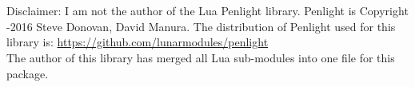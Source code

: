 \documentclass{article}
\begin{document}
    \section*{}
    Disclaimer: I am not the author of the Lua Penlight library.
    Penlight is Copyright -2016 Steve Donovan, David Manura.
    The distribution of Penlight used for this library is:
\url{https://github.com/lunarmodules/penlight}\\
    The author of this library has merged all Lua sub-modules into one file for this package.
\end{document}
